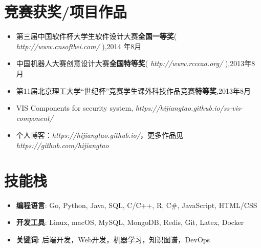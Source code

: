 \documentclass{resume}
\begin{document}
\section{竞赛获奖/项目作品}
\begin{itemize}[parsep=0.2ex]
  \item 第三届中国软件杯大学生软件设计大赛\textbf{全国一等奖}( \textit{http://www.cnsoftbei.com/} ),2014 年8月
  \item 中国机器人大赛创意设计大赛\textbf{全国特等奖}( \textit{http://www.rcccaa.org/} ),2013年8月
  \item 第11届北京理工大学“世纪杯”竞赛学生课外科技作品竞赛\textbf{特等奖},2013年8月
  \item VIS Components for security system, \textit{https://hijiangtao.github.io/ss-vis-component/}
  \item 个人博客：\textit{https://hijiangtao.github.io/}，更多作品见 \textit{https://github.com/hijiangtao}
\end{itemize}

\section{技能栈}
\begin{itemize}[parsep=0.2ex]
  \item \textbf{编程语言}: Go, Python, Java, SQL, C/C++, R, C\#, JavaScript, HTML/CSS
  \item \textbf{开发工具}: Linux, macOS, MySQL, MongoDB, Redis, Git, Latex, Docker
  \item \textbf{关键词}: 后端开发，Web开发，机器学习，知识图谱，DevOps
\end{itemize}
\end{document}
